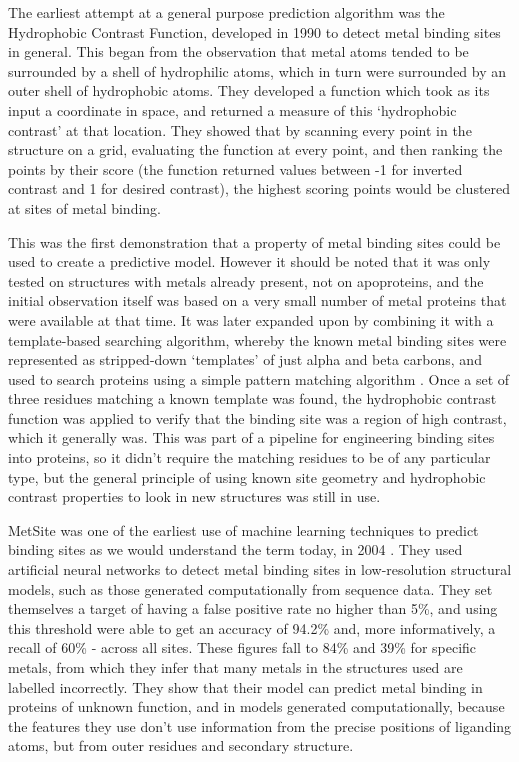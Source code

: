 
The earliest attempt at a general purpose prediction algorithm was the Hydrophobic Contrast Function, developed in 1990 \cite{yamashita1990metal} to detect metal binding sites in general. This began from the observation that metal atoms tended to be surrounded by a shell of hydrophilic atoms, which in turn were surrounded by an outer shell of hydrophobic atoms. They developed a function which took as its input a coordinate in space, and returned a measure of this `hydrophobic contrast' at that location. They showed that by scanning every point in the structure on a grid, evaluating the function at every point, and then ranking the points by their score (the function returned values between -1 for inverted contrast and 1 for desired contrast), the highest scoring points would be clustered at sites of metal binding.

This was the first demonstration that a property of metal binding sites could be used to create a predictive model. However it should be noted that it was only tested on structures with metals already present, not on apoproteins, and the initial observation itself was based on a very small number of metal proteins that were available at that time. It was later expanded upon by combining it with a template-based searching algorithm, whereby the known metal binding sites were represented as stripped-down `templates' of just alpha and beta carbons, and used to search proteins using a simple pattern matching algorithm \cite{gregory1993prediction}. Once a set of three residues matching a known template was found, the hydrophobic contrast function was applied to verify that the binding site was a region of high contrast, which it generally was. This was part of a pipeline for engineering binding sites into proteins, so it didn't require the matching residues to be of any particular type, but the general principle of using known site geometry and hydrophobic contrast properties to look in new structures was still in use.

MetSite was one of the earliest use of machine learning techniques to predict binding sites as we would understand the term today, in 2004 \cite{sodhi2004predicting}. They used artificial neural networks to detect metal binding sites in low-resolution structural models, such as those generated computationally from sequence data. They set themselves a target of having a false positive rate no higher than 5\%, and using this threshold were able to get an 
accuracy of 94.2\% and, more informatively, a recall of 60\% - across all sites. These figures fall to 84\% and 39\% for specific metals, from which they infer that many metals in the structures used are labelled incorrectly. They show that their model can predict metal binding in proteins of unknown function, and in models generated computationally, because the features they use don't use information from the precise positions of liganding atoms, but from outer residues and secondary structure.

